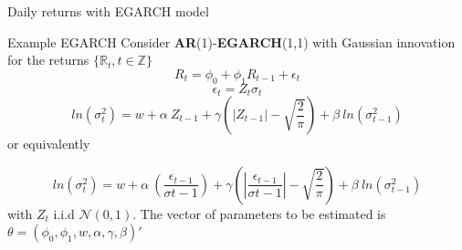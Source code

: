 \documentclass{beamer}
\def\Z{\mathbb{Z}}
\def\R{\mathbb{R}}
\def\Esp{\mathbb{E}}
\def\N{\mathcal{N}}
\newenvironment{wideitemize}{\itemize\addtolength{\itemsep}{10pt}}{\enditemize}
\begin{document}

\begin{frame}{Daily returns with EGARCH model}
    \begin{exampleblock}{Example EGARCH}
        Consider \textbf{AR}(1)-\textbf{EGARCH}(1,1) with Gaussian innovation for the returns $\{\R_t, t\in\Z\}$
        $$R_t = \phi_0 + \phi_1R_{t-1} + \epsilon_t$$
        $$\epsilon_t = Z_t\sigma_t$$
        $$ln(\sigma_t^2) =w + \alpha~ Z_{t-1} + \gamma\left(|Z_{t-1}| - \sqrt{\frac{2}{\pi}} \right) +\beta~ln(\sigma_{t-1}^2)$$
        or equivalently 
        
        $$ln(\sigma_t^2) =w + \alpha~ \left(\frac{\epsilon_{t-1}}{\sigma{t-1}}\right) + \gamma\left(|\frac{\epsilon_{t-1}}{\sigma{t-1}}| - \sqrt{\frac{2}{\pi}} \right) +\beta~ln(\sigma_{t-1}^2)$$
        with  $Z_t$ i.i.d $\N(0,1)$.  The vector of parameters to be estimated is  $\theta = (\phi_0, \phi_1, w, \alpha, \gamma, \beta)'$
    \end{exampleblock}
\end{frame}

  
   
  
\end{document}
